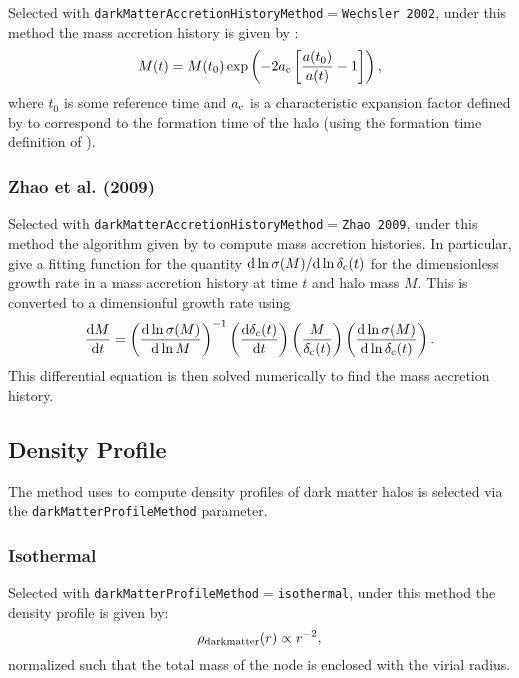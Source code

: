 Selected with {\tt darkMatterAccretionHistoryMethod}$=${\tt Wechsler 2002}, under this method the mass accretion history is given by \citep{wechsler_concentrations_2002}:
\begin{equation}
M(t) = M(t_0) \exp \left( - 2 a_{\rm c} \left[ {a(t_0)\over a(t)}-1 \right] \right),
\end{equation}
where $t_0$ is some reference time and $a_{\rm c}$ is a characteristic expansion factor defined by \cite{wechsler_concentrations_2002} to correspond to the formation time of the halo (using the formation time definition of \citealt{bullock_profiles_2001}).

\subsubsection{Zhao et al. (2009)}

Selected with {\tt darkMatterAccretionHistoryMethod}$=${\tt Zhao 2009}, under this method the algorithm given by \cite{zhao_accurate_2009} to compute mass accretion histories. In particular, \cite{zhao_accurate_2009} give a fitting function for the quantity ${\rm d} \ln \sigma(M)/{\rm d} \ln  \delta_{\rm c}(t)$ for the dimensionless growth rate in a mass accretion history at time $t$ and halo mass $M$. This is converted to a dimensionful growth rate using
\begin{equation}
 {{\rm d} M \over {\rm d} t} = \left({{\rm d} \ln \sigma(M) \over {\rm d} \ln M}\right)^{-1} \left({{\rm d} \delta_c(t) \over {\rm d} t}\right) \left( {M \over \delta_{\rm c}(t)} \right) \left({{\rm d} \ln \sigma(M) \over {\rm d} \ln \delta_{\rm c}(t)}\right).
\end{equation}
This differential equation is then solved numerically to find the mass accretion history.

\subsection{Density Profile}

The method uses to compute density profiles of dark matter halos is selected via the {\tt darkMatterProfileMethod} parameter.

\subsubsection{Isothermal}

Selected with {\tt darkMatterProfileMethod}$=${\tt isothermal}, under this method the density profile is given by:
\begin{equation}
 \rho_{\rm dark matter}(r) \propto r^{-2},
\end{equation}
normalized such that the total mass of the node is enclosed with the virial radius.

